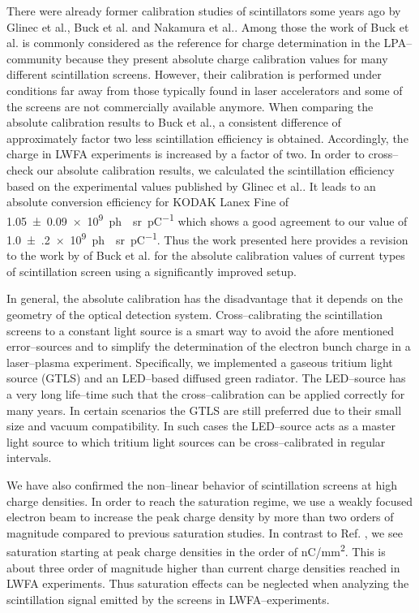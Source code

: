 \documentclass[%
preprint,
amsmath,
amssymb,
aip,
rsi, 
numerical,
floatfix,
]{revtex4-1}
\newcommand{\myCite}[1]{\textcolor{blue}{\cite{#1}}}
\newcommand{\myOnlineCite}[1]{\textcolor{blue}{\onlinecite{#1}}}
\begin{document}
There were already former calibration studies of scintillators some years ago by Glinec et al.\myCite{Glinec2006}, Buck et al.\myCite{Buck2010} and Nakamura et al.\myCite{Nakamura2011}.
Among those the work of Buck et al.\myCite{Buck2010} is commonly considered as the reference for charge determination in the LPA--community because they present absolute  charge calibration values for many different scintillation screens.
However, their calibration is performed under conditions far away from those typically found in laser accelerators and some of the screens are not commercially available anymore.
When comparing the absolute calibration results to Buck et al.\myCite{Buck2010}, a consistent difference of approximately factor two less scintillation efficiency is obtained.
Accordingly, the charge in LWFA experiments is increased by a factor of two.  
In order to cross--check our absolute calibration results, we calculated the scintillation efficiency based on the experimental values published by Glinec et al.\myCite{Glinec2006}. 
It leads to an absolute conversion efficiency for KODAK Lanex Fine of \SI[separate-uncertainty = true]{1.05(9)e9}{ph \per \steradian \per \pico \coulomb} which shows a good agreement to our value of \SI[separate-uncertainty = true]{1.0(2)e9}{ph \per \steradian \per \pico \coulomb}.
Thus the work presented here provides a revision to the work by of Buck et al.\myCite{Buck2010} for the absolute calibration values of current types of scintillation screen using a significantly improved setup.

In general, the absolute calibration has the disadvantage that it depends on the geometry of the optical detection system. 
Cross--calibrating the scintillation screens to a constant light source is a smart way to avoid the afore mentioned error--sources and to simplify the determination of the electron bunch charge in a laser--plasma experiment.
Specifically, we implemented a gaseous tritium light source (GTLS) and an LED--based diffused green radiator.
The LED--source has a very long life--time such that the cross--calibration can be applied correctly for many years. 
In certain scenarios the GTLS are still preferred due to their small size and vacuum compatibility.
In such cases the LED--source acts as a master light source to which tritium light sources can be cross--calibrated in regular intervals.

We have also confirmed the non--linear behavior of scintillation screens at high charge densities.
In order to reach the saturation regime, we use a weakly focused electron beam to increase the peak charge density by more than two orders of magnitude compared to previous saturation studies\myCite{Buck2010}.
In contrast to Ref. \myOnlineCite{Buck2010}, we see saturation starting  at peak charge densities in the order of \si[per-mode = symbol]{\nano\coulomb\per\square\milli\meter}.
This is about three order of magnitude higher than current charge densities reached in LWFA experiments. 
Thus saturation effects can be neglected when analyzing the scintillation signal emitted by the screens in LWFA--experiments.     
\end{document}
